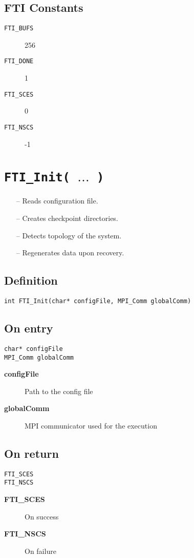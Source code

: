 \documentclass{refrep}
\begin{document}
\subsection{FTI Constants}
\begin{description}
\item[\tt{FTI\_BUFS}] 256
\item[\tt{FTI\_DONE}] 1
\item[\tt{FTI\_SCES}] 0
\item[\tt{FTI\_NSCS}] -1
\end{description}
\newpage
\section{\tt FTI\_Init( $\dots$ )}\label{sec:ftiinit}
\begin{framed}
\begin{itemize}
\item[--] Reads configuration file.
\item[--] Creates checkpoint directories.
\item[--] Detects topology of the system.
\item[--] Regenerates data upon recovery.
\end{itemize}
\end{framed}
\subsection*{Definition}
\begin{lstlisting}[frame=single]
int FTI_Init(char* configFile, MPI_Comm globalComm)
\end{lstlisting}
\subsection*{On entry}
\begin{lstlisting}[frame=single]
char* configFile
MPI_Comm globalComm
\end{lstlisting}
\begin{description}
\item[\textbf{configFile}] Path to the config file
\item[\textbf{globalComm}] MPI communicator used for the execution
\end{description}
\subsection*{On return}
\begin{lstlisting}[frame=single]
FTI_SCES
FTI_NSCS
\end{lstlisting}
\begin{description}
\item[\textbf{FTI\_SCES}] On success
\item[\textbf{FTI\_NSCS}] On failure
\end{description}
\end{document}
